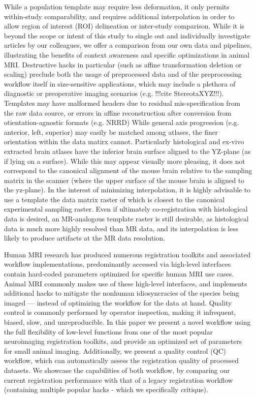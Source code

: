 	While a population template may require less deformation, it only permits within-study comparability, and requires additional interpolation in order to allow region of interest (ROI) delineation or inter-study comparison.
	While it is beyond the scope or intent of this study to single out and individually investigate articles by our colleagues, we offer a comparison from our own data and pipelines, illustrating the benefits of context awareness and specific optimizations in animal MRI.
	Destructive hacks in particular (such as affine transformation deletion or scaling) preclude both the usage of preprocessed data and of the preprocessing workflow itself in size-sensitive applications, which may include a plethora of diagnostic or preoperative imaging scenarios (e.g. !!!cite StereotaXYZ!!!).
	Templates may have malformed headers due to residual mis-specification from the raw data source, or errors in affine reconstruction after conversion from otientation-agnostic formats (e.g. NRRD)
	While general axis progression (e.g. anterior, left, superior) may easily be matched among atlases, the finer orientation within the data matirx cannot.
	Particularly histological and ex-vivo extracted brain atlases have the inferior brain surface aligned to the YZ-plane (as if lying on a surface).
	While this may appear visually more pleasing, it does not correspond to the canonical alignment of the mouse brain relative to the sampling matrix in the scanner (where the upper surface of the mouse brain is aligned to the yz-plane).
	In the interest of minimizing interpolation, it is highly advisable to use a template the data matrix raster of which is closest to the canonical experimental sampling raster.
	Even if ultimately co-registration with histological data is desired, an MR-analogous template raster is still desirable, as histological data is much more highly resolved than MR data, and its interpolation is less likely to produce artifacts at the MR data resolution. 


Human MRI research has produced numerous registration toolkits and associated workflow implementations, predominantly accessed via high-level interfaces contain hard-coded parameters optimized for specific human MRI use cases.
Animal MRI commonly makes use of these high-level interfaces, and implements additional hacks to mitigate the nonhuman idiosyncracies of the species being imaged --- instead of optimizing the workflow for the data at hand.
Quality control is commonly performed by operator inspection, making it infrequent, biased, slow, and unreproducible.
In this paper we present a novel workflow using the full flexibility of low-level functions from one of the most popular neuroimaging registration toolkits, and provide an optimized set of parameters for small animal imaging.
Additionally, we present a quality control (QC) workflow, which can automatically assess the registration quality of processed datasets.
We showcase the capabilities of both workflow, by comparing our current registration performance with that of a legacy registration workflow (containing multiple popular hacks - which we specifically critique).

